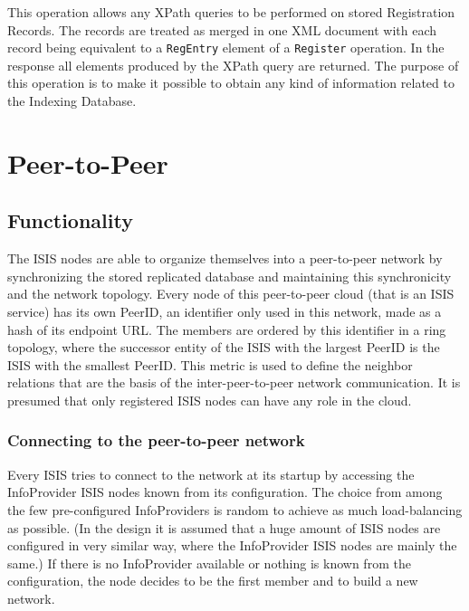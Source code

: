 \documentclass{book}
\begin{document}
This operation allows any XPath queries to be performed on stored Registration Records. The records are treated as merged in one XML document with each record being equivalent to a \texttt{RegEntry} element of a \texttt{Register} operation. In the response all elements produced by the XPath query are returned. The purpose of this operation is to make it possible to obtain any kind of information related to the Indexing Database.



\section{Peer-to-Peer}
\label{sec:isis_peer_to_peer}

\subsection{Functionality}
\label{sub:peer_to_peer_functionality}
The ISIS nodes are able to organize themselves into a peer-to-peer network by synchronizing the stored replicated database and maintaining this synchronicity and the network topology. Every node of this peer-to-peer cloud (that is an ISIS service) has its own PeerID, an identifier only used in this network, made as a hash of its endpoint URL. The members are ordered by this identifier in a ring topology, where the successor entity of the ISIS with the largest PeerID is the ISIS with the smallest PeerID. This metric is used to define the neighbor relations that are the basis of the inter-peer-to-peer network communication. It is presumed that only registered ISIS nodes can have any role in the cloud.

\subsubsection{Connecting to the peer-to-peer network}
Every ISIS tries to connect to the network at its startup by accessing the InfoProvider ISIS nodes known from its configuration. The choice from among the few pre-configured InfoProviders is random to achieve as much load-balancing as possible. (In the design it is assumed that a huge amount of ISIS nodes are configured in very similar way, where the InfoProvider ISIS nodes are mainly the same.) If there is no InfoProvider available or nothing is known from the configuration, the node decides to be the first member and to build a new network.
\end{document}
